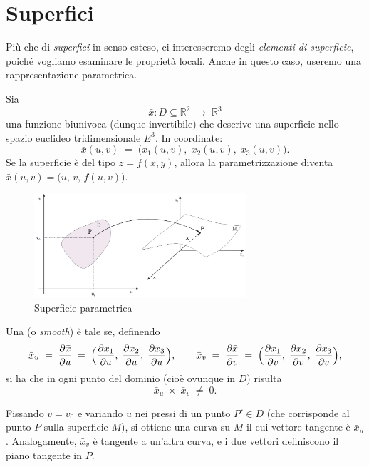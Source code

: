 \section{Superfici}

Più che di \emph{superfici} in senso esteso, ci interesseremo degli \emph{elementi di superficie}, poiché vogliamo esaminare le proprietà locali. Anche in questo caso, useremo una rappresentazione parametrica.

Sia
$$
\bar{x}\colon D \subseteq \mathbb{R}^2 \;\to\; \mathbb{R}^3
$$
una funzione biunivoca (dunque invertibile) che descrive una superficie nello spazio euclideo tridimensionale $E^3$. In coordinate:
$$
\bar{x}(u,v)
\;=\;
\bigl(x_1(u,v),\;x_2(u,v),\;x_3(u,v)\bigr).
$$
Se la superficie è del tipo $z = f(x,y)$, allora la parametrizzazione diventa $\bar x(u,v) = \bigl(u,\,v,\,f(u,v)\bigr)$.

\begin{figure}[H]
    \centering
    \includegraphics[width=0.7\textwidth]{assets/surface.png}
    \caption{Superficie parametrica}
\end{figure}

\begin{definitionblock}
Una  (o \emph{smooth}) è tale se, definendo
$$
\bar{x}_u
\;=\;
\dfrac{\partial \bar{x}}{\partial u}
\;=\;
\Bigl(\dfrac{\partial x_1}{\partial u},\;\dfrac{\partial x_2}{\partial u},\;\dfrac{\partial x_3}{\partial u}\Bigr),
\qquad
\bar{x}_v
\;=\;
\dfrac{\partial \bar{x}}{\partial v}
\;=\;
\Bigl(\dfrac{\partial x_1}{\partial v},\;\dfrac{\partial x_2}{\partial v},\;\dfrac{\partial x_3}{\partial v}\Bigr),
$$
si ha che in ogni punto del dominio (cioè ovunque in $D$) risulta
$$
\bar{x}_u \;\times\; \bar{x}_v \;\neq\; 0.
$$
\end{definitionblock}

Fissando $v=v_0$ e variando $u$ nei pressi di un punto $P'\!\in D$ (che corrisponde al punto $P$ sulla superficie $M$), si ottiene una curva su $M$ il cui vettore tangente è $\bar{x}_u$. Analogamente, $\bar{x}_v$ è tangente a un’altra curva, e i due vettori definiscono il piano tangente in $P$.

